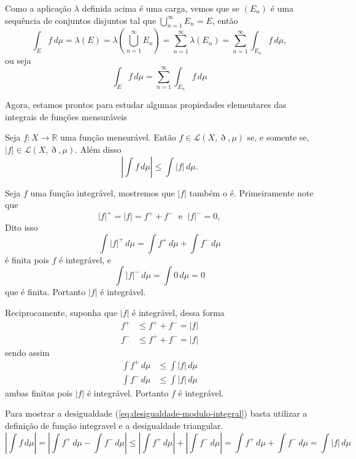 \documentclass[a4paper, 11pt]{book}
\theoremstyle{definition}
\newcommand{\bR}{\mathbb{R}}
\newcommand{\cL}{\mathcal{L}}
\begin{document}
Como a aplicação $\lambda$ definida acima é uma carga, vemos que se $(E_n)$ é uma sequência de conjuntos disjuntos tal que $\bigcup_{n=1}^{\infty} E_n = E$, então
\[
    \int_E f \,d\mu = \lambda(E) = \lambda \left( \bigcup_{n=1}^{\infty} E_n \right) = \sum_{n=1}^{\infty} \lambda(E_n) = \sum_{n=1}^{\infty} \int_{E_n} f\,d\mu,
\]
ou seja
\[
    \int_E f \, d\mu = \sum_{n=1}^{\infty} \int_{E_n} f\,d\mu
\]

Agora, estamos prontos para estudar algumas propiedades elementares das integrais de funções mensuráveis

\begin{tbox} \label{thm:modulo-funcao-integravel}
    Seja $f : X \to \bR$ uma função mensurável.
    Então $f \in \cL(X,\eth,\mu)$ se, e somente se, $|f| \in \cL(X,\eth,\mu)$.
    Além disso
    \begin{equation} \label{eq:desigualdade-modulo-integral}
        \left\vert \int f \,d\mu \right\vert \leqslant \int |f| \,d\mu.
    \end{equation}
\end{tbox}
\begin{prf}
    Seja $f$ uma função integrável, mostremos que $|f|$ também o é.
    Primeiramente note que
    \[
        |f|^+ = |f| = f^+ + f^- \;\text{ e }\; |f|^- = 0,
    \]
    Dito isso
    \[
        \int |f|^+ \,d\mu = \int f^+ \,d\mu + \int f^- \,d\mu
    \]
    é finita pois $f$ é integrável, e
    \[
        \int |f|^- \,d\mu = \int 0 \,d\mu = 0
    \]
    que é finita.
    Portanto $|f|$ é integrável.

    Reciprocamente, suponha que $|f|$ é integrável, dessa forma
    \[
        \begin{aligned}
            f^+ &\leqslant f^+ + f^- = |f|\\
            f^- &\leqslant f^+ + f^- = |f|
        \end{aligned}
    \]
    sendo assim
    \[
        \begin{aligned}
            \int f^+ \,d\mu &\leqslant \int |f| \,d\mu\\
            \int f^- \,d\mu &\leqslant \int |f| \,d\mu
        \end{aligned}
    \]
    ambas finitas pois $|f|$ é integrável.
    Portanto $f$ é integrável.

    Para mostrar a desigualdade (\ref{eq:desigualdade-modulo-integral}) basta utilizar a definição de função integravel e a desigualdade triangular.
    \[
        \left\vert \int f \,d\mu \right\vert = \left\vert \int f^+ \,d\mu - \int f^- \,d\mu \right\vert \leqslant \left\vert \int f^+ \,d\mu \right\vert + \left\vert \int f^- \,d\mu \right\vert = \int f^+ \,d\mu + \int f^- \,d\mu = \int |f| \,d\mu
    \]
\end{prf}
\end{document}
